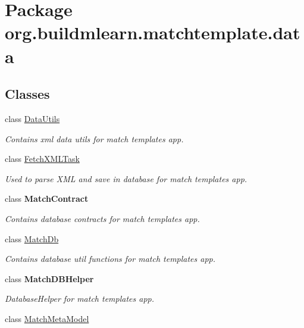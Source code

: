 \hypertarget{namespaceorg_1_1buildmlearn_1_1matchtemplate_1_1data}{}\section{Package org.\+buildmlearn.\+matchtemplate.\+data}
\label{namespaceorg_1_1buildmlearn_1_1matchtemplate_1_1data}
\subsection*{Classes}
\begin{DoxyCompactItemize}
\item 
class \hyperlink{classorg_1_1buildmlearn_1_1matchtemplate_1_1data_1_1DataUtils}{Data\+Utils}
\begin{DoxyCompactList}\small\item\em Contains xml data utils for match template\textquotesingle{}s app. \end{DoxyCompactList}\item 
class \hyperlink{classorg_1_1buildmlearn_1_1matchtemplate_1_1data_1_1FetchXMLTask}{Fetch\+X\+M\+L\+Task}
\begin{DoxyCompactList}\small\item\em Used to parse X\+ML and save in database for match template\textquotesingle{}s app. \end{DoxyCompactList}\item 
class {\bfseries Match\+Contract}
\begin{DoxyCompactList}\small\item\em Contains database contracts for match template\textquotesingle{}s app. \end{DoxyCompactList}\item 
class \hyperlink{classorg_1_1buildmlearn_1_1matchtemplate_1_1data_1_1MatchDb}{Match\+Db}
\begin{DoxyCompactList}\small\item\em Contains database util functions for match template\textquotesingle{}s app. \end{DoxyCompactList}\item 
class {\bfseries Match\+D\+B\+Helper}
\begin{DoxyCompactList}\small\item\em Database\+Helper for match template\textquotesingle{}s app. \end{DoxyCompactList}\item 
class \hyperlink{classorg_1_1buildmlearn_1_1matchtemplate_1_1data_1_1MatchMetaModel}{Match\+Meta\+Model}

\end{DoxyCompactItemize}
